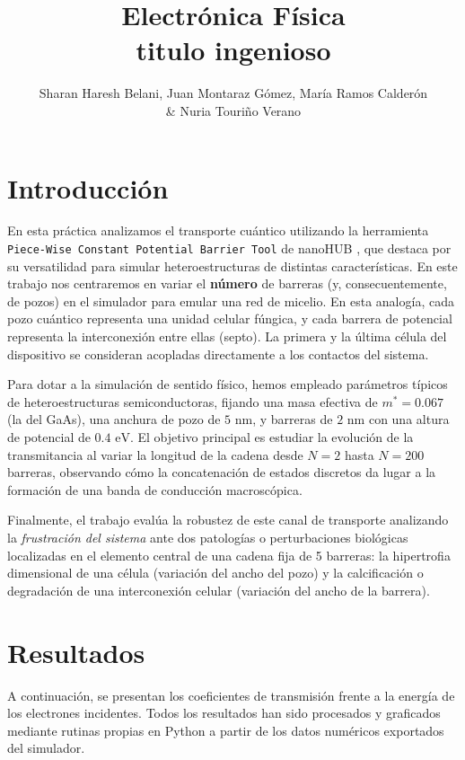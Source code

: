 \documentclass[11pt,a4paper]{article}
\title{Electrónica Física\\
titulo ingenioso}
\author{Sharan Haresh Belani, Juan Montaraz Gómez, María Ramos Calderón\\ \&
Nuria Touriño Verano}
\begin{document}
\maketitle

\section{Introducción}
En esta práctica analizamos el transporte cuántico utilizando la herramienta \texttt{Piece-Wise Constant Potential Barrier Tool} de nanoHUB \cite{nano}, que destaca por su versatilidad para simular heteroestructuras de distintas características. En este trabajo nos centraremos en variar el \textbf{número} de barreras (y, consecuentemente, de pozos) en el simulador para emular una red de micelio. En esta analogía, cada pozo cuántico representa una unidad celular fúngica, y cada barrera de potencial representa la interconexión entre ellas (septo). La primera y la última célula del dispositivo se consideran acopladas directamente a los contactos del sistema.

Para dotar a la simulación de sentido físico, hemos empleado parámetros típicos de heteroestructuras semiconductoras, fijando una masa efectiva de $m^* = 0.067$ (la del GaAs), una anchura de pozo de $5\text{ nm}$, y barreras de $2\text{ nm}$ con una altura de potencial de $0.4\text{ eV}$. El objetivo principal es estudiar la evolución de la transmitancia al variar la longitud de la cadena desde $N=2$ hasta $N=200$ barreras, observando cómo la concatenación de estados discretos da lugar a la formación de una banda de conducción macroscópica. 

Finalmente, el trabajo evalúa la robustez de este canal de transporte analizando la \textit{frustración del sistema} ante dos patologías o perturbaciones biológicas localizadas en el elemento central de una cadena fija de 5 barreras: la hipertrofia dimensional de una célula (variación del ancho del pozo) y la calcificación o degradación de una interconexión celular (variación del ancho de la barrera).

\section{Resultados}
A continuación, se presentan los coeficientes de transmisión frente a la energía de los electrones incidentes. Todos los resultados han sido procesados y graficados mediante rutinas propias en Python a partir de los datos numéricos exportados del simulador.
\end{document}
